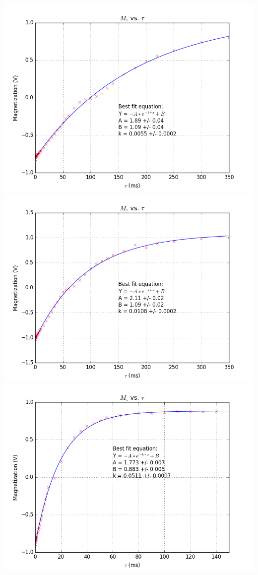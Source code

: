 \documentclass{article}
\begin{document}
{\begin{multicols}{2}
\includegraphics[width=\linewidth]{pic-for-report/0.005M-CuSO4-T1.png}
\label{fig:20}
\includegraphics[width=\linewidth]{pic-for-report/0.010M-CuSO4-T1.png}
\label{fig:21}
\includegraphics[width=\linewidth]{pic-for-report/0.050M-CuSO4-T1-inset.png}

\end{multicols}}
\end{document}
